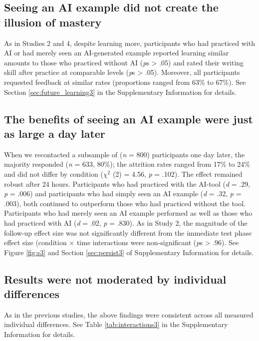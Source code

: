 \documentclass[11pt]{report}
\begin{document}
\begin{mainf}
\subsection*{Seeing an AI example did not create the illusion of mastery}

As in Studies 2 and 4, despite learning more, participants who had practiced with AI or had merely seen an AI-generated example reported learning similar amounts to those who practiced without AI (\textit{p}s > .05) and rated their writing skill after practice at comparable levels (\textit{p}s > .05). Moreover, all participants requested feedback at similar rates (proportions ranged from 63\% to 67\%). See Section \ref{sec:future_learning3} in the Supplementary Information for details.


\subsection*{The benefits of seeing an AI example were just as large a day later}\label{the-effects-of-seeing-an-ai-example-persist}

When we recontacted a subsample of (\textit{n} = 800) participants one day later, 
  the majority responded (\textit{n} = 633, 80\%); the attrition rates ranged from 17\% to 24\% and did not differ by condition ($\chi^2$ (2) = 4.56, \textit{p} = .102).
  The effect remained robust after 24 hours. Participants who had practiced with the AI-tool (\emph{d} = .29, \emph{p} = .006) and participants who had simply seen an AI example (\emph{d} = .32, \emph{p} = .003), both continued to outperform those who had practiced without the tool. Participants who had merely seen an AI example performed as well as those who had practiced with AI (\emph{d} = .02, \emph{p} = .830). As in Study 2, the magnitude of the follow-up effect size was not significantly different from the immediate test phase effect size (condition $\times$ time interactions were non-significant (\textit{p}s > .96). See Figure \ref{fig:s3} and Section \ref{sec:persist3} of Supplementary Information for details.

\subsection*{Results were not moderated by individual differences}
As in the previous studies, the above findings were consistent across all measured individual differences. See Table \ref{tab:interactions3} in the
Supplementary Information for details.


\end{mainf}
\end{document}
